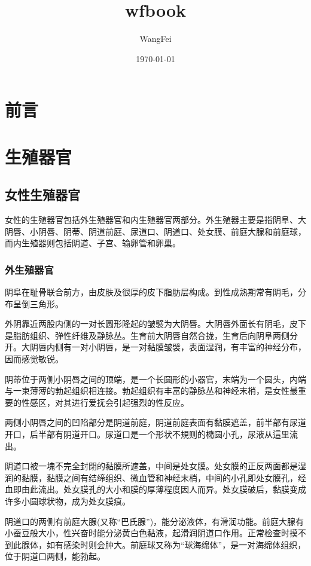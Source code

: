 \documentclass[12pt,UTF8]{ctexbook}
\title{\heiti\zihao{0} wfbook}
\author{WangFei}
\date{\today}
\begin{document}
\maketitle
\tableofcontents

\frontmatter

\chapter{前言}



\mainmatter

\chapter{生殖器官}

\section{女性生殖器官}

女性的生殖器官包括外生殖器官和内生殖器官两部分。外生殖器主要是指阴阜、大阴唇、小阴唇、阴蒂、阴道前庭、尿道口、阴道口、处女膜、前庭大腺和前庭球，而内生殖器则包括阴道、子宫、输卵管和卵巢。

\subsection{外生殖器官}

阴阜在耻骨联合前方，由皮肤及很厚的皮下脂肪层构成。到性成熟期常有阴毛，分布呈倒三角形。

外阴靠近两股内侧的一对长圆形隆起的皱襞为大阴唇。大阴唇外面长有阴毛，皮下是脂肪组织、弹性纤维及静脉丛。生育前大阴唇自然合拢，生育后向阴阜两侧分开。大阴唇内侧有一对小阴唇，是一对黏膜皱襞，表面湿润，有丰富的神经分布，因而感觉敏锐。

阴蒂位于两侧小阴唇之间的顶端，是一个长圆形的小器官，末端为一个圆头，内端与一束薄薄的勃起组织相连接。勃起组织有丰富的静脉丛和神经末梢，是女性最重要的性感区，对其进行爱抚会引起强烈的性反应。

两侧小阴唇之间的凹陷部分是阴道前庭，阴道前庭表面有黏膜遮盖，前半部有尿道开口，后半部有阴道开口。尿道口是一个形状不規则的橢圆小孔，尿液从這里流出。

阴道口被一塊不完全封閉的黏膜所遮盖，中间是处女膜。处女膜的正反两面都是湿润的黏膜，黏膜之间有结缔组织、微血管和神经末梢，中间的小孔即处女膜孔，经血即由此流出。处女膜孔的大小和膜的厚薄程度因人而异。处女膜破后，黏膜变成许多小圆球状物，成为处女膜痕。

阴道口的两侧有前庭大腺(又称“巴氏腺”)，能分泌液体，有滑润功能。前庭大腺有小蚕豆般大小，性兴奋时能分泌黄白色黏液，起滑润阴道口作用。正常检查时摸不到此腺体，如有感染时则会肿大。前庭球又称为“球海绵体”，是一对海绵体组织，位于阴道口两侧，能勃起。
\end{document}
